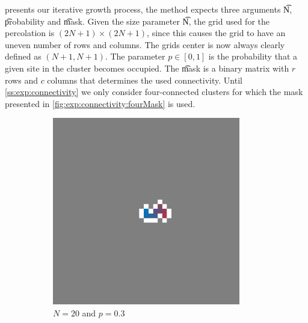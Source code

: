  presents our iterative growth process, the method  expects three arguments \t{N}, \t{probability} and \t{mask}. Given the size parameter \t{N}, the grid used for the percolation is $(2N + 1) \times (2N + 1)$, since this causes the grid to have an uneven number of rows and columns. The grids center is now always clearly defined as $(N + 1, N + 1)$. The parameter $p \in [0, 1]$ is the probability that a given site in the cluster becomes occupied. The \t{mask} is a binary matrix with $r$ rows and $c$ columns that determines the used connectivity. Until \cref{ss:exp:connectivity} we only consider four-connected clusters for which the mask presented in \cref{fig:exp:connectivity:fourMask} is used.\\

\begin{figure}
	\centering	
	\begin{subfigure}{0.27\textwidth}
		\centering
		\includegraphics[width=0.9\textwidth]{./img/fancy_cluster_N20_p3_rng_8}
		\caption{$N = 20$ and $p = 0.3$}
		\label{fig:method:fin_inf:finiteSmall}
	\end{subfigure}
	\begin{subfigure}{0.27\textwidth}
		\centering

\end{subfigure}
\end{figure}
